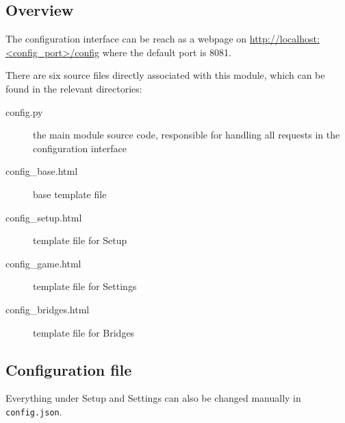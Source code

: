 
\subsection{Overview}
The configuration interface can be reach as a webpage on
\url{http://localhost:<config_port>/config} where the default port is 8081.

There are six source files directly associated with this module, which can be
found in the relevant directories:

  \begin{description}
    \item[config.py]
     the main module source code, responsible for handling all requests in the configuration interface
    \item[config\_base.html]
     base template file
    \item[config\_setup.html]
     template file for Setup
    \item[config\_game.html]
     template file for Settings
    \item[config\_bridges.html]
     template file for Bridges
  \end{description}

\subsection{Configuration file}
Everything under Setup and Settings can also be changed manually in
\texttt{config.json}.

